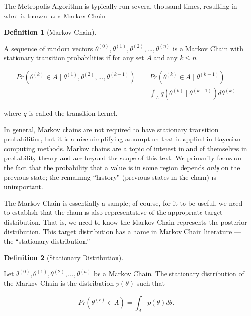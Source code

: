 \documentclass[
  letterpaper,
  DIV=11,
  numbers=noendperiod]{scrreprt}
\theoremstyle{definition}
\newtheorem{definition}{Definition}[chapter]
\theoremstyle{plain}
\theoremstyle{definition}
\theoremstyle{remark}
\begin{document}
The Metropolis Algorithm is typically run several thousand times,
resulting in what is known as a Markov Chain.

\begin{definition}[Markov
Chain]\protect\hypertarget{def-markov-chain}{}\label{def-markov-chain}

A sequence of random vectors
\(\theta^{(0)}, \theta^{(1)}, \theta^{(2)}, \dotsc, \theta^{(n)}\) is a
Markov Chain with stationary transition probabilities if for any set
\(A\) and any \(k \leq n\)

\[
\begin{aligned}
  Pr\left(\theta^{(k)} \in A \mid \theta^{(1)}, \theta^{(2)}, \dotsc, \theta^{(k-1)}\right)
    &= Pr\left(\theta^{(k)} \in A \mid \theta^{(k-1)}\right) \\
    &= \int_{A} q\left(\theta^{(k)} \mid \theta^{(k-1)}\right) d\theta^{(k)}
\end{aligned}
\]

where \(q\) is called the transition kernel.

\end{definition}

In general, Markov chains are not required to have stationary transition
probabilities, but it is a nice simplifying assumption that is applied
in Bayesian computing methods. Markov chains are a topic of interest in
and of themselves in probability theory and are beyond the scope of this
text. We primarily focus on the fact that the probability that a value
is in some region depends \emph{only} on the previous state; the
remaining ``history'' (previous states in the chain) is unimportant.

The Markov Chain is essentially a sample; of course, for it to be
useful, we need to establish that the chain is also representative of
the appropriate target distribution. That is, we need to know the Markov
Chain represents the posterior distribution. This target distribution
has a name in Markov Chain literature --- the ``stationary
distribution.''

\begin{definition}[Stationary
Distribution]\protect\hypertarget{def-stationary-distribution}{}\label{def-stationary-distribution}

Let \(\theta^{(0)}, \theta^{(1)}, \theta^{(2)}, \dotsc, \theta^{(n)}\)
be a Markov Chain. The stationary distribution of the Markov Chain is
the distribution \(p(\theta)\) such that

\[Pr\left(\theta^{(k)} \in A\right) = \int_{A} p(\theta) d\theta.\]

\end{definition}
\end{document}
